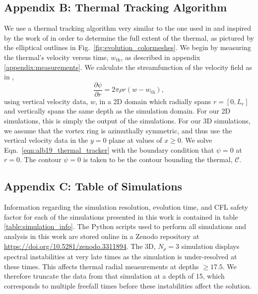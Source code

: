 \subsection{Appendix B: Thermal Tracking Algorithm}
\label{appendix:tracking}
We use a thermal tracking algorithm very similar to the one used in  \cite{lecoanet&jeevanjee2018} and inspired by the work of \cite{romps&all2015} in order to determine the full extent of the thermal, as pictured by the elliptical outlines in Fig.~\ref{fig:evolution_colormeshes}. 
We begin by measuring the thermal's velocity versus time, $w_{\text{th}}$, as described in appendix \ref{appendix:measurements}. 
We calculate the streamfunction of the velocity field as in \cite{romps&all2015},
\begin{equation}
\frac{\partial \psi}{\partial r} = 2\pi \rho r (w - w_{\text{th}}),
\label{eqn:alb19_thermal_tracker}
\end{equation}
using vertical velocity data, $w$, in a 2D domain which radially spans $r = [0, L_r]$ and vertically spans the same depth as the simulation domain.
For our 2D simulations, this is simply the output of the simulations.
For our 3D simulations, we assume that the vortex ring is azimuthally symmetric, and thus use the vertical velocity data in the $y = 0$ plane at values of $x \geq 0$.
We solve Eqn.~\ref{eqn:alb19_thermal_tracker} with the boundary condition that $\psi = 0$ at $r = 0$. 
The contour $\psi = 0$ is taken to be the contour bounding the thermal, $\mathcal{C}$.

\subsection{Appendix C: Table of Simulations}
\label{appendix:table}
Information regarding the simulation resolution, evolution time, and CFL safety factor for each of the simulations presented in this work is contained in table \ref{table:simulation_info}.
The Python scripts used to perform all simulations and analysis in this work are stored online in a Zenodo repository \cite{supp_andersetall2019b} at \url{https://doi.org/10.5281/zenodo.3311894}.
The 3D, $N_\rho = 3$ simulation displays spectral instabilities at very late times as the simulation is under-resolved at these times.
This affects thermal radial measurements at depths $\geq 17.5$.
We therefore truncate the data from that simulation at a depth of 15, which corresponds to multiple freefall times before these instabilities affect the solution.

